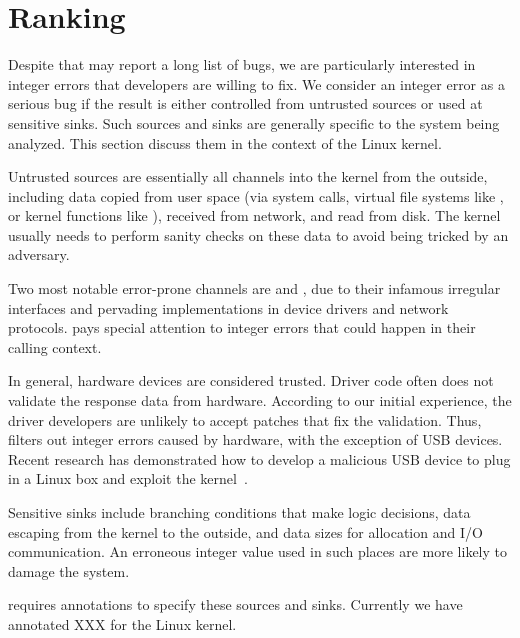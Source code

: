 \section{Ranking}

Despite that \sys may report a long list of bugs, we are particularly
interested in integer errors that developers are willing to fix.
We consider an integer error as a serious bug if the result is
either controlled from untrusted sources or used at sensitive sinks.
Such sources and sinks are generally specific to the system being
analyzed.  This section discuss them in the context of the Linux
kernel.

Untrusted sources are essentially all channels into the kernel from
the outside, including data copied from user space (via system
calls, virtual file systems like , or kernel functions
like ), received from network, and read from
disk.
The kernel usually needs to perform sanity checks on these data to
avoid being tricked by an adversary.

Two most notable error-prone channels are  and ,
due to their infamous irregular interfaces and pervading implementations
in device drivers and network protocols.  \sys pays special attention
to integer errors that could happen in their calling context.

In general, hardware devices are considered trusted.  Driver code
often does not validate the response data from hardware.  According
to our initial experience, the driver developers are unlikely to
accept patches that fix the validation.  Thus, \sys filters out
integer errors caused by hardware,
%
with the exception of USB devices.  Recent research has demonstrated
how to develop a malicious USB device to plug in a Linux box and
exploit the kernel~\cite{usb:buffer-overflow}.

Sensitive sinks include branching conditions that make logic
decisions, data escaping from the kernel to the outside, and data
sizes for allocation and I/O communication.  An erroneous integer
value used in such places are more likely to damage the system.

\sys requires annotations to specify these sources and sinks.
Currently we have annotated XXX for the Linux kernel.
